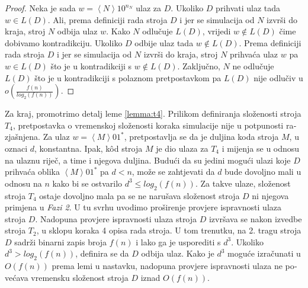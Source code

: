 \documentclass[12pt]{rectors}
\begin{document}
\begin{otherlanguage}{croatian}
\begin{proof}
Neka je sada $w = \left < N \right >10^{n_N}$ ulaz za $D$.\newline
Ukoliko $D$ prihvati ulaz tada $w \in L(D)$. Ali, prema definiciji rada stroja $D$ i jer se simulacija od $N$ izvrši do kraja,  
stroj $N$ odbija ulaz $w$. Kako $N$ odlučuje $L(D)$, vrijedi $w \notin L(D)$ čime dobivamo kontradikciju.\newline
Ukoliko $D$ odbije ulaz tada $w \notin L(D)$. Prema definiciji rada stroja $D$ i jer se simulacija od $N$ izvrši do kraja,  
stroj $N$ prihvaća ulaz $w$ pa $w\in L(D)$ što je u kontradikciji s $w \notin L(D)$.\newline
Zaključno, $N$ ne odlučuje $L(D)$ što je u kontradikciji s polaznom pretpostavkom
pa $L(D)$ nije odlučiv u $o \left (\frac {f\left ( n \right )}{log_2\left ( f\left ( n \right ) \right )} \right )$.
\end{proof}
\vspace{1cm}
Za kraj, promotrimo detalj leme \ref{lemma:t4}.
Prilikom definiranja složenosti stroja $T_4$, pretpostavka o vremenskoj složenosti koraka simulacije nije u potpunosti razjašnjena. Za ulaz $w = \left < M \right >01^*$, pretpostavlja se da je duljina koda stroja $M$, u oznaci $d$, konstantna.
Ipak, k\^{o}d stroja $M$ je dio ulaza za $T_4$ i mijenja se u odnosu na ulaznu riječ, a time i njegova duljina. 
Budući da
su jedini mogući ulazi koje $D$ prihvaća oblika $\left < M \right >01^*$ pa $d < n$, može se zahtjevati da $d$ bude dovoljno mali u odnosu na $n$ kako bi se ostvarilo $d^3 \leq log_2(f(n))$. Za takve ulaze, složenost stroja $T_4$ ostaje dovoljno mala pa se ne narušava složenost stroja $D$ ni njegova primjena u \textit{Fazi 2}.
U tu svrhu uvodimo proširenje provjere ispravnosti ulaza stroja $D$.
Nadopuna provjere ispravnosti ulaza stroja $D$ izvršava se nakon 
izvedbe stroja $T_2$, u sklopu koraka 4 opisa rada stroja. U tom trenutku, na
2. tragu stroja $D$ sadrži binarni zapis broja $f(n)$ i lako ga je usporediti
s $d^3$. Ukoliko $d^3 > log_2 \left ( f(n) \right ) $, definira se da $D$ odbija ulaz.
Kako je $d^3$ moguće izračunati u $O(f(n))$ prema lemi u nastavku, nadopuna provjere ispravnosti ulaza ne 
povećava vremensku složenost stroja $D$ iznad $O(f(n))$.\newline





\end{otherlanguage}
\end{document}
